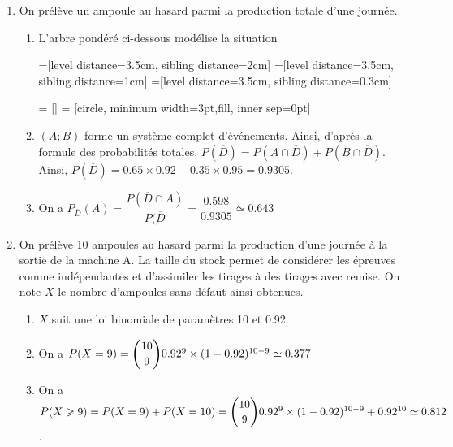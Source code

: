 \documentclass[11pt,fleqn, openany]{book} %
\begin{document}
\begin{solution}\hspace{0pt}

\begin{enumerate}
\item On prélève un ampoule au hasard parmi la production totale d'une journée.
\begin{enumerate}
\item L'arbre pondéré ci-dessous modélise la situation

=[level distance=3.5cm, sibling distance=2cm]
=[level distance=3.5cm, sibling distance=1cm]
=[level distance=3.5cm, sibling distance=0.3cm]

 = []
 = [circle, minimum width=3pt,fill, inner sep=0pt]


\begin{center}
\end{center}

\item $(A;B)$ forme un système complet d'événements. Ainsi, d'après la formule des probabilités totales, $P(\overline{D})=P(A \cap \overline{D})+P(B \cap \overline{D})$. Ainsi, $P(\overline{D})=0.65 \times 0.92 + 0.35 \times 0.95 = 0.9305$.
\item On a $P_{\overline{D}}(A)=\dfrac{P(\overline{D} \cap A)}{P(\overline{D}}=\dfrac{0.598}{0.9305}\simeq 0.643$
\end{enumerate}
\item On prélève 10 ampoules au hasard parmi la production d'une journée à la sortie de la machine A. La taille du stock permet de considérer les épreuves comme indépendantes et d'assimiler les tirages à des tirages avec remise. On note $X$ le nombre d'ampoules sans défaut ainsi obtenues.
\begin{enumerate}
\item $X$ suit une loi binomiale de paramètres 10 et 0.92.
\item On a $P(X=9)=\dbinom{10}{9}0.92^9 \times (1-0.92)^{10-9} \simeq 0.377$
\item On a $P(X \geqslant 9) = P(X =9)+P(X=10)=\dbinom{10}{9}0.92^9 \times (1-0.92)^{10-9} + 0.92^{10} \simeq 0.812$.
\end{enumerate}

\end{enumerate}\end{solution}
\end{document}

